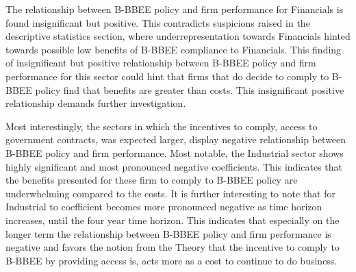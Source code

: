 The relationship between B-BBEE policy and firm performance for Financials is found insignificant but positive. This contradicts suspicions raised in the descriptive statistics section, where underrepresentation towards Financials hinted towards possible low benefits of B-BBEE compliance to Financials. This finding of insignificant but positive relationship between B-BBEE policy and firm performance for this sector could hint that firms that do decide to comply to B-BBEE policy find that benefits are greater than costs. This insignificant positive relationship demands further investigation.

Most interestingly, the sectors in which the incentives to comply, access to government contracts, was expected larger, display negative relationship between B-BBEE policy and firm performance. Most notable, the Industrial sector shows highly significant and most pronounced negative coefficients. This indicates that the benefits presented for these firm to comply to B-BBEE policy are underwhelming compared to the costs. It is further interesting to note that for Industrial to coefficient becomes more pronounced negative as time horizon increases, until the four year time horizon. This indicates that especially on the longer term the relationship between B-BBEE policy and firm performance is negative and favors the notion from the Theory that the incentive to comply to B-BBEE by providing access is, acts more as a cost to continue to do business. 
